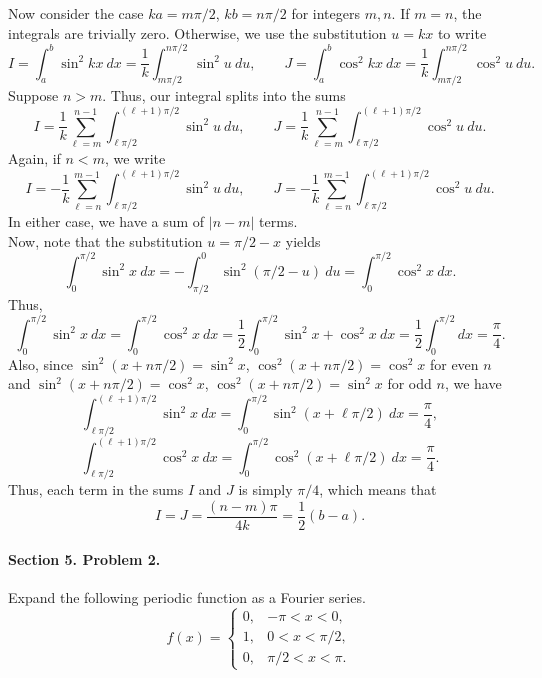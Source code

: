 \documentclass[10pt]{article}
\begin{document}
        Now consider the case $ka = m\pi /2$, $kb = n\pi/2$ for integers $m, n$. If $m = n$, the integrals are trivially zero.
        Otherwise, we use the substitution $u = kx$ to write
        \[
                I = \int_a^b \sin^2{kx}\: dx = \frac{1}{k}\int_{m\pi/2}^{n\pi/2} \sin^2{u}\: du, \qquad
                J = \int_a^b \cos^2{kx}\: dx = \frac{1}{k}\int_{m\pi/2}^{n\pi/2} \cos^2{u}\: du.
        \]
        Suppose $n > m$. Thus, our integral splits into the sums
        \[
                I = \frac{1}{k}\sum_{\ell = m}^{n-1} \int_{\ell\pi/2}^{(\ell + 1)\pi/2} \sin^2{u}\: du, \qquad
                J = \frac{1}{k}\sum_{\ell = m}^{n-1} \int_{\ell\pi/2}^{(\ell + 1)\pi/2} \cos^2{u}\: du.
        \]
        Again, if $n < m$, we write
        \[
                I = -\frac{1}{k}\sum_{\ell = n}^{m-1} \int_{\ell\pi/2}^{(\ell + 1)\pi/2} \sin^2{u}\: du, \qquad
                J = -\frac{1}{k}\sum_{\ell = n}^{m-1} \int_{\ell\pi/2}^{(\ell + 1)\pi/2} \cos^2{u}\: du.
        \]
        In either case, we have a sum of $|n - m|$ terms. \\

        Now, note that the substitution $u = \pi/2 - x$ yields
        \[
                \int_0^{\pi/2} \sin^2{x}\:dx = -\int_{\pi/2}^0\sin^2(\pi/2 - u)\:du = \int_0^{\pi/2}\cos^2{x}\:dx.
        \]
        Thus,
        \[
                \int_0^{\pi/2} \sin^2{x}\:dx = \int_0^{\pi/2}\cos^2{x}\:dx = \frac{1}{2}\int_0^{\pi/2} \sin^2{x} + \cos^2{x}\:dx = 
                        \frac{1}{2}\int_0^{\pi/2}dx = \frac{\pi}{4}.
        \]
        Also, since $\sin^2(x + n\pi/2) = \sin^2{x}$, $\cos^2(x + n\pi/2) = \cos^2{x}$ for even $n$ and 
        $\sin^2(x + n\pi/2) = \cos^2{x}$, $\cos^2(x + n\pi/2) = \sin^2{x}$ for odd $n$, we have
        \[
                \int_{\ell\pi/2}^{(\ell + 1)\pi/2} \sin^2{x}\:dx = \int_{0}^{\pi/2} \sin^2(x + \ell\pi/2)\:dx = \frac{\pi}{4},
        \]
        \[
                \int_{\ell\pi/2}^{(\ell + 1)\pi/2} \cos^2{x}\:dx = \int_{0}^{\pi/2} \cos^2(x + \ell\pi/2)\:dx = \frac{\pi}{4}.
        \]
        Thus, each term in the sums $I$ and $J$ is simply $\pi/4$, which means that
        \[
                I = J = \frac{(n - m)\pi}{4k} = \frac{1}{2}(b - a).\tag*{\qed}
        \]

        \paragraph{Section 5. Problem 2.} Expand the following periodic function as a Fourier series.
        \[
                f(x) = \begin{cases}
                        0, & -\pi < x < 0,      \\
                        1, & 0 < x < \pi/2,     \\
                        0, & \pi/2 < x < \pi.
                \end{cases}
        \]
        
\end{document}
